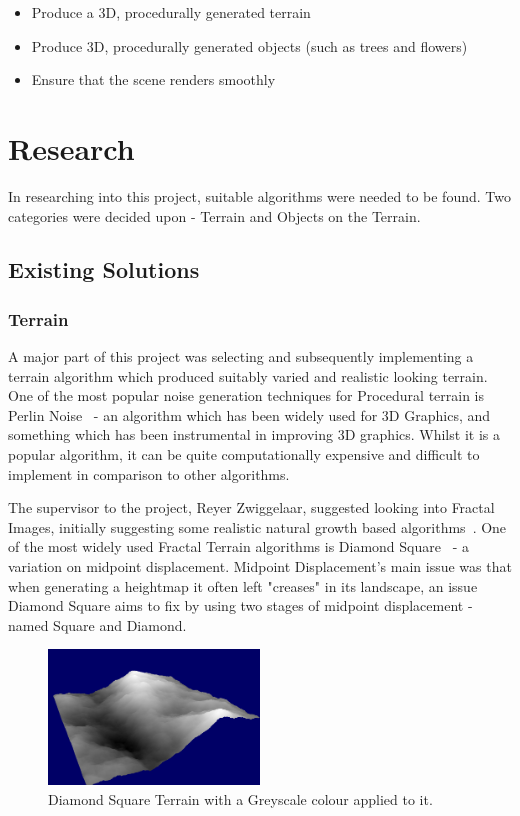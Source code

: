 \documentclass[a4paper,10pt]{report}
\begin{document}
\begin{itemize}
    \item Produce a 3D, procedurally generated terrain
    \item Produce 3D, procedurally generated objects (such as trees and flowers)
    \item Ensure that the scene renders smoothly
\end{itemize}

\chapter{Research}

In researching into this project, suitable algorithms were needed to be found. Two categories were decided upon - Terrain and Objects on the Terrain. \medskip

\section{Existing Solutions}

\subsection{Terrain}

A major part of this project was selecting and subsequently implementing a terrain algorithm which produced suitably varied and realistic looking terrain. One of the most popular noise generation techniques for Procedural terrain is Perlin Noise~\cite{perlin2002improving} - an algorithm which has been widely used for 3D Graphics, and something which has been instrumental in improving 3D graphics. Whilst it is a popular algorithm, it can be quite computationally expensive and difficult to implement in comparison to other algorithms.\medskip

The supervisor to the project, Reyer Zwiggelaar, suggested looking into Fractal Images, initially suggesting some realistic natural growth based algorithms~\cite{Bilsborough3424}. One of the most widely used Fractal Terrain algorithms is Diamond Square~\cite{olsen2004realtime} - a variation on midpoint displacement. Midpoint Displacement's main issue was that when generating a heightmap it often left "creases" in its landscape, an issue Diamond Square aims to fix by using two stages of midpoint displacement - named Square and Diamond.  \medskip

\begin{figure}[h!]
    \centering
  \includegraphics[width=0.5\textwidth]{Images/Screenshots/DiamondSquareGreyScale.png}
 \caption{Diamond Square Terrain with a Greyscale colour applied to it.}
 \label{fig:DiamondSquareGrey}
\end{figure}
\end{document}

